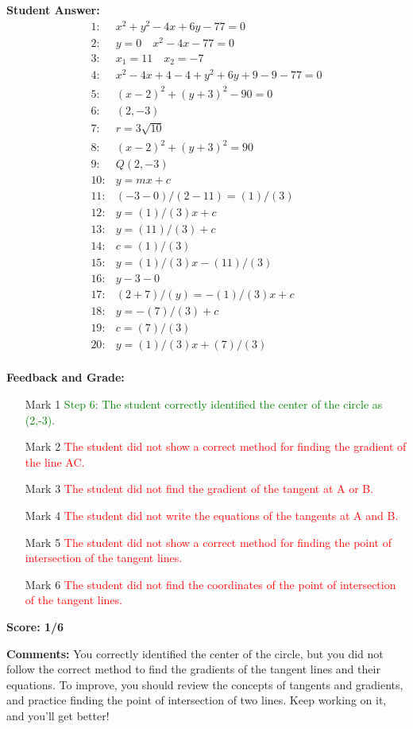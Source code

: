 \documentclass{article}
\begin{document}
\textbf{Student Answer:}
\begin{align*}
1: & x^{2}+y^{2}-4x+6y-77=0 \\
2: & y=0 \quad x^{2}-4x-77=0 \\
3: & x_1=11 \quad x_2=-7 \\
4: & x^{2}-4x+4-4+y^{2}+6y+9-9-77=0 \\
5: & (x-2)^{2}+(y+3)^{2}-90=0 \\
6: & (2,-3) \\
7: & r=3\sqrt{10} \\
8: & (x-2)^{2}+(y+3)^{2}=90 \\
9: & Q(2,-3) \\
10: & y=mx+c \\
11: & (-3-0)/(2-11)=(1)/(3) \\
12: & y=(1)/(3)x+c \\
13: & y=(11)/(3)+c \\
14: & c=(1)/(3) \\
15: & y=(1)/(3)x-(11)/(3) \\
16: & y-3-0 \\
17: & (2+7)/(y)=-(1)/(3)x+c \\
18: & y=-(7)/(3)+c \\
19: & c=(7)/(3) \\
20: & y=(1)/(3)x+(7)/(3) \\
\end{align*}

\textbf{Feedback and Grade:}
\begin{itemize}
\item[Mark 1] \textcolor{green}{Step 6: The student correctly identified the center of the circle as (2,-3).}
\item[Mark 2] \textcolor{red}{The student did not show a correct method for finding the gradient of the line AC.}
\item[Mark 3] \textcolor{red}{The student did not find the gradient of the tangent at A or B.}
\item[Mark 4] \textcolor{red}{The student did not write the equations of the tangents at A and B.}
\item[Mark 5] \textcolor{red}{The student did not show a correct method for finding the point of intersection of the tangent lines.}
\item[Mark 6] \textcolor{red}{The student did not find the coordinates of the point of intersection of the tangent lines.}
\end{itemize}

\textbf{Score: 1/6}

\textbf{Comments:} You correctly identified the center of the circle, but you did not follow the correct method to find the gradients of the tangent lines and their equations. To improve, you should review the concepts of tangents and gradients, and practice finding the point of intersection of two lines. Keep working on it, and you'll get better! 
\end{document}
